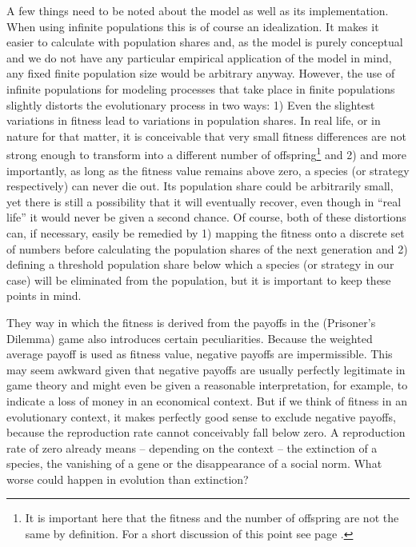 A few things need to be noted about the model as well as its implementation.
When using infinite populations this is of course an idealization. It makes it
easier to calculate with population shares and, as the model is purely
conceptual and we do not have any particular empirical application of the
model in mind, any fixed finite population size would be arbitrary anyway.
However, the use of infinite populations for modeling processes that take
place in finite populations slightly distorts the evolutionary process in two
ways: 1) Even the slightest variations in fitness lead to variations in
population shares.  In real life, or in nature for that matter, it is
conceivable that very small fitness differences are not strong enough to
transform into a different number of offspring\footnote{It is important here
  that the fitness and the number of offspring are not the same by definition.
  For a short discussion of this point see page \pageref{tautologyCharge}.}
and 2) and more importantly, as long as the fitness value remains above zero,
a species (or strategy respectively) can never die out. Its population share
could be arbitrarily small, yet there is still a possibility that it will
eventually recover, even though in ``real life'' it would never be given a
second chance.  Of course, both of these distortions can, if necessary, easily
be remedied by 1) mapping the fitness onto a discrete set of numbers before
calculating the population shares of the next generation and 2) defining a
threshold population share below which a species (or strategy in our case)
will be eliminated from the population, but it is important to keep these
points in mind.

They way in which the fitness is derived from the payoffs in the
(Prisoner's Dilemma) game also introduces certain peculiarities.
Because the weighted average payoff is used as fitness value, negative
payoffs are impermissible. This may seem awkward given that negative
payoffs are usually perfectly legitimate in game theory and might even
be given a reasonable interpretation, for example, to indicate a loss
of money in an economical context. But if we think of fitness in an
evolutionary context, it makes perfectly good sense to exclude negative
payoffs, because the reproduction rate cannot conceivably fall below
zero. A reproduction rate of zero already means -- depending on the
context -- the extinction of a species, the vanishing of a gene or the
disappearance of a social norm. What worse could happen in evolution
than extinction?

